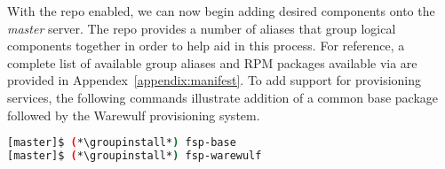 With the \FSP{} repo enabled, we can now begin adding desired components onto the
{\em master} server. The \FSP{} repo provides a number of aliases that group
logical components together in order to help aid in this process. For
reference, a complete list of available group aliases and RPM packages available
via \FSP{} are provided in Appendex~\ref{appendix:manifest}.  To add
support for provisioning services, the following commands illustrate addition
of a common base package followed by the Warewulf provisioning system.

\begin{lstlisting}[language=bash,keywords={}]
[master]$ (*\groupinstall*) fsp-base
[master]$ (*\groupinstall*) fsp-warewulf
\end{lstlisting}

